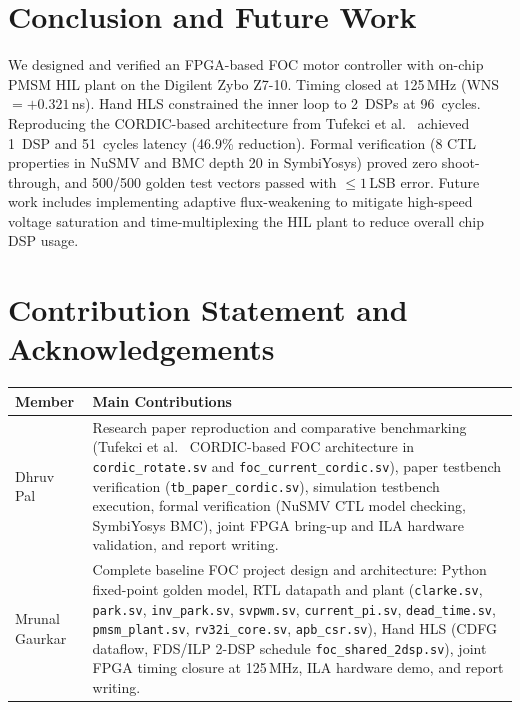 \documentclass[11pt,a4paper]{article}
\newcommand{\studentA}{Dhruv Pal}
\newcommand{\studentB}{Mrunal Gaurkar}
\begin{document}
\section{Conclusion and Future Work}
\label{sec:conclusion}

We designed and verified an FPGA-based FOC motor controller with on-chip PMSM HIL plant on the Digilent Zybo Z7-10. Timing closed at 125\,MHz (WNS\,$=+0.321$\,ns). Hand HLS constrained the inner loop to 2~DSPs at 96~cycles. Reproducing the CORDIC-based architecture from Tufekci et al.~\cite{tufekci2020} achieved 1~DSP and 51~cycles latency (46.9\% reduction). Formal verification (8 CTL properties in NuSMV and BMC depth 20 in SymbiYosys) proved zero shoot-through, and 500/500 golden test vectors passed with $\le 1$\,LSB error. Future work includes implementing adaptive flux-weakening to mitigate high-speed voltage saturation and time-multiplexing the HIL plant to reduce overall chip DSP usage.

\section*{Contribution Statement and Acknowledgements}
\label{sec:contrib}

\begin{table}[H]\centering\small
\begin{tabularx}{\linewidth}{@{}lX@{}}
\toprule
\textbf{Member} & \textbf{Main Contributions}\\
\midrule
\studentA & Research paper reproduction and comparative benchmarking (Tufekci et al.~\cite{tufekci2020} CORDIC-based FOC architecture in \texttt{cordic\_rotate.sv} and \texttt{foc\_current\_cordic.sv}), paper testbench verification (\texttt{tb\_paper\_cordic.sv}), simulation testbench execution, formal verification (NuSMV CTL model checking, SymbiYosys BMC), joint FPGA bring-up and ILA hardware validation, and report writing.\\
\studentB & Complete baseline FOC project design and architecture: Python fixed-point golden model, RTL datapath and plant (\texttt{clarke.sv}, \texttt{park.sv}, \texttt{inv\_park.sv}, \texttt{svpwm.sv},   \texttt{current\_pi.sv}, \texttt{dead\_time.sv}, \texttt{pmsm\_plant.sv}, \texttt{rv32i\_core.sv}, \texttt{apb\_csr.sv}), Hand HLS (CDFG dataflow, FDS/ILP 2-DSP schedule \texttt{foc\_shared\_2dsp.sv}), joint FPGA timing closure at 125\,MHz, ILA hardware demo, and report writing.\\
\bottomrule
\end{tabularx}
\end{table}
\end{document}
